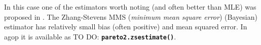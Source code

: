 \documentclass[11pt]{article}\usepackage{graphicx, color}
\newcommand{\hlfunctioncall}[1]{\textcolor[rgb]{0.501960784313725,0,0.329411764705882}{\textbf{#1}}}%
\newcommand{\package}[1]{\textsf{#1}\xspace}
\newcommand{\Rfunc}[1]{\texttt{\hlfunctioncall{#1}}}
\newcommand{\vect}[1]{{\mathbf{#1}}}
\theoremstyle{remark}
\theoremstyle{definition}
\begin{document}
In this case one of the estimators worth noting (and often better than MLE) was proposed
in \cite{ZhangStevens2009:estgpd}.
The Zhang-Stevens MMS (\textit{minimum mean square error}) (Bayesian)
estimator has relatively small bias (often positive) and mean squared error.
In \package{agop} it is available as TO DO: \Rfunc{pareto2.zsestimate()}.

% 
\end{document}
